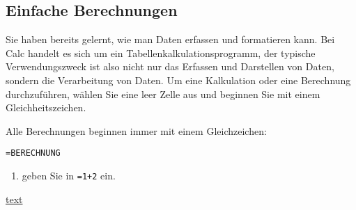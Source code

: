 \subsection{Einfache Berechnungen}
Sie haben bereits gelernt, wie man Daten erfassen und formatieren kann. Bei Calc handelt es sich um ein Tabellenkalkulationsprogramm, der typische Verwendungszweck ist also nicht nur das Erfassen und Darstellen von Daten, sondern die Verarbeitung von Daten. Um eine Kalkulation oder eine Berechnung durchzuführen, wählen Sie eine leer Zelle aus und beginnen Sie mit einem Gleichheitszeichen.
\begin{tcolorbox}
    Alle Berechnungen beginnen immer mit einem Gleichzeichen:

    \lstinline|=BERECHNUNG|
\end{tcolorbox}
\begin{Exercise}[title={Öffnen Sie Calc und\dots}, label=EinfacheBerechnungen]
    \begin{enumerate}
        \item geben Sie in  \lstinline|=1+2| ein.
    \end{enumerate}
\end{Exercise}


\href{file:./Uebungsblaetter/2_EinfacheBerechnungen.ods}{text}




\begin{Answer}[ref=EinfacheBerechnungen]

\end{Answer}